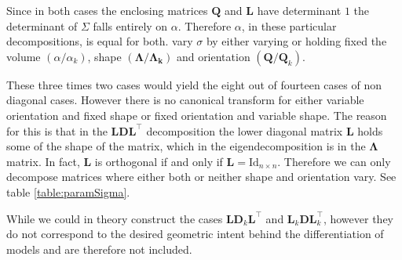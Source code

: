 Since in both cases the enclosing matrices $ \pmb{Q} $ and $ \pmb{L} $ have 
determinant $1$ the determinant of $\Sigma$ falls entirely on $ \alpha $.
Therefore $ \alpha $, in these particular decompositions, is equal for both.
\cite{Cel95} vary $\sigma$ by either varying or holding fixed the volume 
$(\alpha / \alpha_k)$, shape $(\pmb{\Lambda} / \pmb{\Lambda_k})$ and orientation
$(\pmb{Q} / \pmb{Q}_k)$.

These three times two cases would yield the eight out of fourteen cases of non 
diagonal cases. However there is no canonical transform for either variable 
orientation and fixed shape or fixed orientation and variable shape.
The reason for this is that in the $\pmb{LDL}^\top$ decomposition the lower
diagonal matrix $\pmb{L}$ holds some of the shape of the matrix, which in 
the eigendecomposition is in the $\pmb{\Lambda}$ matrix.
In fact, $\pmb{L}$ is orthogonal if and only if $\pmb{L} = \mathrm{Id}_{n\times n}$.
Therefore we can only decompose matrices where either both or neither shape and
orientation vary. See table \ref{table:paramSigma}.

While we could in theory construct the cases $\pmb{L}\pmb{D}_k\pmb{L}^\top$ and
$\pmb{L}_k \pmb{D} \pmb{L}_k^\top$, however they do not correspond to the desired
geometric intent behind the differentiation of models and are therefore not 
included.


